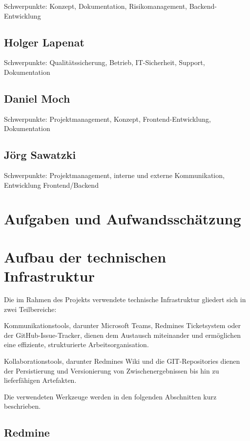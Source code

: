 \documentclass[a4paper,11pt,listof=numbered,glossary=totoc,parskip=half,toc=bib]{scrreprt}
\begin{document}
Schwerpunkte: Konzept, Dokumentation, Risikomanagement, Backend-Entwicklung

\subsection{Holger Lapenat}

Schwerpunkte: Qualitätssicherung, Betrieb, IT-Sicherheit, Support, Dokumentation

\subsection{Daniel Moch}

Schwerpunkte: Projektmanagement, Konzept, Frontend-Entwicklung, Dokumentation

\subsection{Jörg Sawatzki}

Schwerpunkte: Projektmanagement, interne und externe Kommunikation, Entwicklung Frontend/Backend


	
	\newpage
	\section{Aufgaben und Aufwandsschätzung}
	
	\newpage
	\section{Aufbau der technischen Infrastruktur}

Die im Rahmen des Projekts verwendete technische Infrastruktur gliedert sich in zwei Teilbereiche:

Kommunikationstools, darunter Microsoft Teams, Redmines Ticketsystem oder der GitHub-Issue-Tracker, dienen dem Austausch miteinander und ermöglichen eine effiziente, strukturierte Arbeitsorganisation.

Kollaborationstools, darunter Redmines Wiki und die GIT-Repositories dienen der Persistierung und Versionierung von Zwischenergebnissen bis hin zu lieferfähigen Artefakten.

Die verwendeten Werkzeuge werden in den folgenden Abschnitten kurz beschrieben.

\subsection{Redmine}
\end{document}
